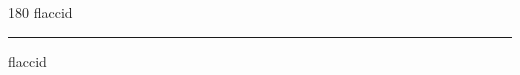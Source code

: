 
\begin{frame}
\begin{center}
\begin{turn}{180}
{\fontsize{2.5cm}{1em}\selectfont flaccid}
\end{turn}
\vspace{1em}\par  
\hrule
\vspace{1em}\par  
{\fontsize{2.5cm}{1em}\selectfont flaccid}
\end{center}
\end{frame}
